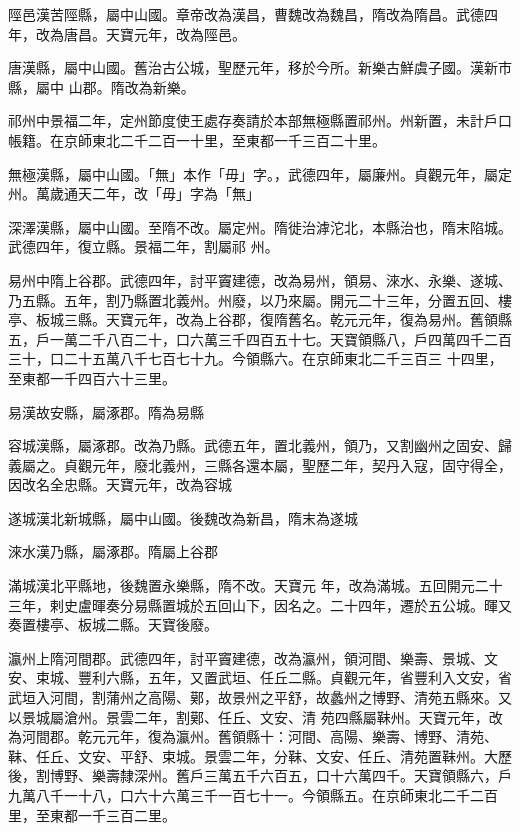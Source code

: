 \begin{pinyinscope}
 陘邑漢苦陘縣，屬中山國。章帝改為漢昌，曹魏改為魏昌，隋改為隋昌。武德四年，改為唐昌。天寶元年，改為陘邑。



 唐漢縣，屬中山國。舊治古公城，聖歷元年，移於今所。新樂古鮮虞子國。漢新市縣，屬中
 山郡。隋改為新樂。



 祁州中景福二年，定州節度使王處存奏請於本部無極縣置祁州。州新置，未計戶口帳籍。在京師東北二千二百一十里，至東都一千三百二十里。



 無極漢縣，屬中山國。「無」本作「毋」字。，武德四年，屬廉州。貞觀元年，屬定州。萬歲通天二年，改「毋」字為「無」



 深澤漢縣，屬中山國。至隋不改。屬定州。隋徙治滹沱北，本縣治也，隋末陷城。武德四年，復立縣。景福二年，割屬祁
 州。



 易州中隋上谷郡。武德四年，討平竇建德，改為易州，領易、淶水、永樂、遂城、乃五縣。五年，割乃縣置北義州。州廢，以乃來屬。開元二十三年，分置五回、樓亭、板城三縣。天寶元年，改為上谷郡，復隋舊名。乾元元年，復為易州。舊領縣五，戶一萬二千八百二十，口六萬三千四百五十七。天寶領縣八，戶四萬四千二百三十，口二十五萬八千七百七十九。今領縣六。在京師東北二千三百三
 十四里，至東都一千四百六十三里。



 易漢故安縣，屬涿郡。隋為易縣



 容城漢縣，屬涿郡。改為乃縣。武德五年，置北義州，領乃，又割幽州之固安、歸義屬之。貞觀元年，廢北義州，三縣各還本屬，聖歷二年，契丹入寇，固守得全，因改名全忠縣。天寶元年，改為容城



 遂城漢北新城縣，屬中山國。後魏改為新昌，隋末為遂城



 淶水漢乃縣，屬涿郡。隋屬上谷郡



 滿城漢北平縣地，後魏置永樂縣，隋不改。天寶元
 年，改為滿城。五回開元二十三年，剌史盧暉奏分易縣置城於五回山下，因名之。二十四年，遷於五公城。暉又奏置樓亭、板城二縣。天寶後廢。



 瀛州上隋河間郡。武德四年，討平竇建德，改為瀛州，領河間、樂壽、景城、文安、束城、豐利六縣，五年，又置武垣、任丘二縣。貞觀元年，省豐利入文安，省武垣入河間，割蒲州之高陽、鄚，故景州之平舒，故蠡州之博野、清苑五縣來。又以景城屬滄州。景雲二年，割鄚、任丘、文安、清
 苑四縣屬靺州。天寶元年，改為河間郡。乾元元年，復為瀛州。舊領縣十：河間、高陽、樂壽、博野、清苑、靺、任丘、文安、平舒、束城。景雲二年，分靺、文安、任丘、清苑置靺州。大歷後，割博野、樂壽隸深州。舊戶三萬五千六百五，口十六萬四千。天寶領縣六，戶九萬八千一十八，口六十六萬三千一百七十一。今領縣五。在京師東北二千二百里，至東都一千三百二里。




\end{pinyinscope}

